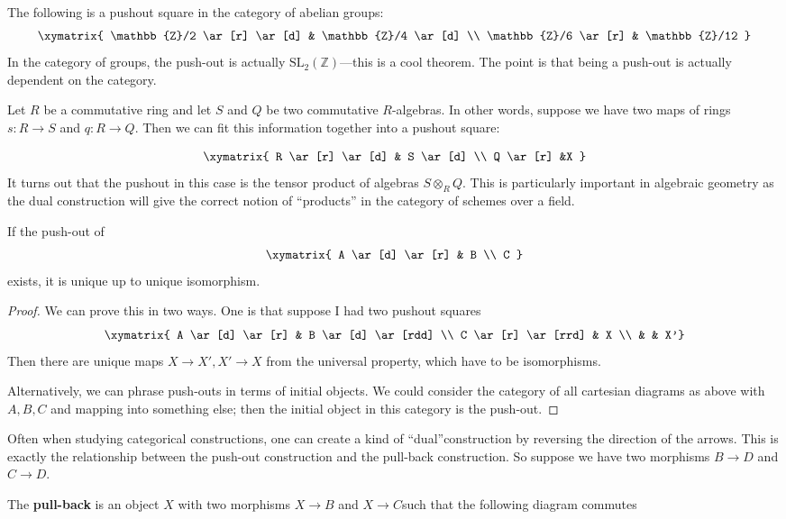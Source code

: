 \begin{proposition}
\begin{example}
The following is a pushout square in the category of abelian groups:
\[ \xymatrix{
\mathbb{Z}/2 \ar[r] \ar[d]  &  \mathbb{Z}/4 \ar[d]  \\
\mathbb{Z}/6 \ar[r] &  \mathbb{Z}/12
}\]
In the category of groups, the push-out is actually
$\mathrm{SL}_2(\mathbb{Z})$---this is a cool theorem. The point is that being a
push-out is actually dependent on the category.
\end{example}

\begin{example}
Let $R$ be a commutative ring and let $S$ and $Q$ be two commutative
$R$-algebras. In other words, suppose
we have two maps of rings $s:R\rightarrow S$ and $q:R\rightarrow Q$. Then we
can fit this information together
into a pushout square:

\[ \xymatrix{
R \ar[r] \ar[d]  &  S \ar[d]   \\
Q \ar[r] &X
}\]
It turns out that the pushout in this case is the tensor product of algebras
$S\otimes_R Q$. This is particularly important
in algebraic geometry as the dual construction will give the correct notion of
``products'' in the category of schemes over
a field.\end{example}

\begin{proposition}
If the push-out of
\[ \xymatrix{
A \ar[d] \ar[r] & B \\
C
}\]
exists, it is unique up to unique isomorphism.
\end{proposition}
\begin{proof}
We can prove this in two ways. One is that suppose I had two pushout squares
\[
\xymatrix{
A \ar[d] \ar[r] &  B \ar[d] \ar[rdd] \\
C \ar[r] \ar[rrd] &  X \\
& & X'}
\]
Then there are unique maps $X \to X', X' \to X$ from the universal property,
which have to be isomorphisms.

Alternatively, we can phrase push-outs in terms of initial objects. We could
consider the category of all cartesian diagrams as above with $A,B,C$ and
mapping into something else; then the initial
object in this category is the push-out.
\end{proof}

Often when studying categorical constructions, one can create a kind of
``dual''construction by reversing the direction of the arrows. This is exactly
the
relationship between the push-out construction and the pull-back construction.
So suppose we have two morphisms $B \to D$ and $C\to D$.
\begin{definition}
The \textbf{pull-back} is an object $X$ with two morphisms $X\to B$ and $X\to
C$such that the following diagram commutes


\end{definition}
\end{proposition}
